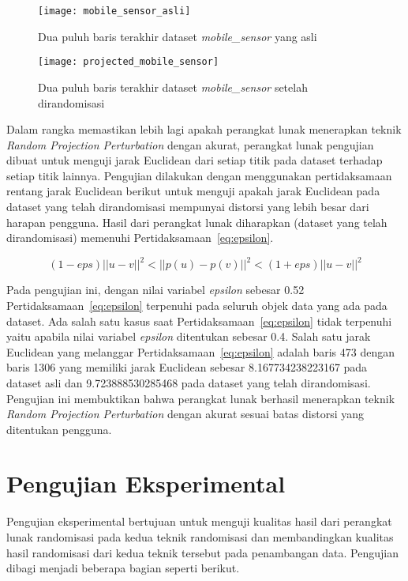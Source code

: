 \begin{figure}
	\centering
	\texttt{[image: mobile\_sensor\_asli]}
	\caption{Dua puluh baris terakhir dataset \textit{mobile\_sensor} yang asli}
	\label{fig:mobile_sensor_asli}
\end{figure}

\begin{figure}
	\centering
	\texttt{[image: projected\_mobile\_sensor]}
	\caption{Dua puluh baris terakhir dataset \textit{mobile\_sensor} setelah dirandomisasi}
	\label{fig:projected_mobile_sensor}
\end{figure}

Dalam rangka memastikan lebih lagi apakah perangkat lunak menerapkan teknik \textit{Random Projection Perturbation} dengan akurat, perangkat lunak pengujian dibuat untuk menguji jarak Euclidean dari setiap titik pada dataset terhadap setiap titik lainnya. Pengujian dilakukan dengan menggunakan pertidaksamaan rentang jarak Euclidean berikut untuk menguji apakah jarak Euclidean pada dataset yang telah dirandomisasi mempunyai distorsi yang lebih besar dari harapan pengguna. Hasil dari perangkat lunak diharapkan (dataset yang telah dirandomisasi) memenuhi Pertidaksamaan~\ref{eq:epsilon}.

\begin{equation}\label{eq:epsilon}
	(1-eps)||u - v||^{2}<||p(u) - p(v)||^{2}<(1+eps)||u - v||^{2}
\end{equation}

Pada pengujian ini, dengan nilai variabel \textit{epsilon} sebesar 0.52 Pertidaksamaan~\ref{eq:epsilon} terpenuhi pada seluruh objek data yang ada pada dataset. Ada salah satu kasus saat Pertidaksamaan~\ref{eq:epsilon} tidak terpenuhi yaitu apabila nilai variabel \textit{epsilon} ditentukan sebesar 0.4. Salah satu jarak Euclidean yang melanggar Pertidaksamaan~\ref{eq:epsilon} adalah baris 473 dengan baris 1306 yang memiliki jarak Euclidean sebesar 8.167734238223167 pada dataset asli dan 9.723888530285468 pada dataset yang telah dirandomisasi. Pengujian ini membuktikan bahwa perangkat lunak berhasil menerapkan teknik \textit{Random Projection Perturbation} dengan akurat sesuai batas distorsi yang ditentukan pengguna.

\section{Pengujian Eksperimental}
\label{sec:pengujianeksperimental}

Pengujian eksperimental bertujuan untuk menguji kualitas hasil dari perangkat lunak randomisasi pada kedua teknik randomisasi dan membandingkan kualitas hasil randomisasi dari kedua teknik tersebut pada penambangan data. Pengujian dibagi menjadi beberapa bagian seperti berikut.

